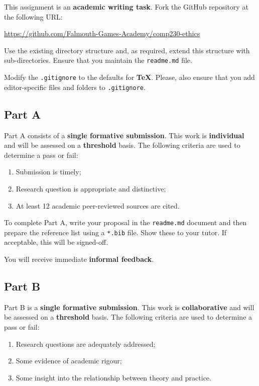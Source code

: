 \documentclass{../../fal_assignment}
\newcommand{\minReferenceCount}{12 }
\begin{document}
This assignment is an \textbf{academic writing task}. Fork the GitHub repository at the following URL:

\indent \url{https://github.com/Falmouth-Games-Academy/comp230-ethics}

Use the existing directory structure and, as required, extend this structure with sub-directories. Ensure that you maintain the \texttt{readme.md} file.

Modify the \texttt{.gitignore} to the defaults for \textbf{TeX}. Please, also ensure that you add editor-specific files and folders to \texttt{.gitignore}. 

\subsection*{Part A}

Part A consists of a \textbf{single formative submission}. This work is \textbf{individual} and will be assessed on a \textbf{threshold} basis. The following criteria are used to determine a pass or fail:

\begin{enumerate}[label=(\alph*)]
	\item Submission is timely;
	\item Research question is appropriate and distinctive;
	\item At least \minReferenceCount  academic peer-reviewed sources are cited.
\end{enumerate}

To complete Part A, write your proposal in the \texttt{readme.md} document and then prepare the reference list using a \texttt{*.bib} file.  Show these to your tutor.  If acceptable, this will be signed-off. 

You will receive immediate \textbf{informal feedback}.

\subsection*{Part B}

Part B is a \textbf{single formative submission}. This work is \textbf{collaborative} and will be assessed on a \textbf{threshold} basis. The following criteria are used to determine a pass or fail:

\begin{enumerate}[label=(\alph*)]
	\item Research questions are adequately addressed;
	\item Some evidence of academic rigour;
	\item Some insight into the relationship between theory and practice.
\end{enumerate}
\end{document}
